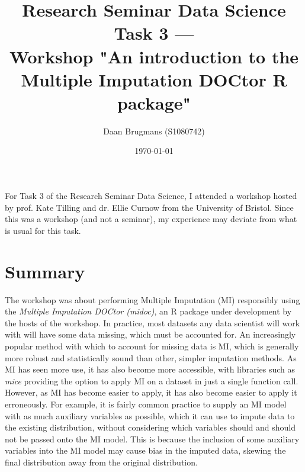 \documentclass{IEEEtran}
\begin{document}
\title{Research Seminar Data Science Task 3 --- \\Workshop "An introduction to the Multiple Imputation DOCtor R package"}
\author{Daan Brugmans (S1080742)}
\date{\today}

\maketitle

For Task 3 of the Research Seminar Data Science, I attended a workshop hosted by prof. Kate Tilling and dr. Ellie Curnow from the University of Bristol.
Since this was a workshop (and not a seminar), my experience may deviate from what is usual for this task.

\section{Summary}
The workshop was about performing Multiple Imputation (MI) responsibly using the \textit{Multiple Imputation DOCtor (midoc)}, an R package under development by the hosts of the workshop.
In practice, most datasets any data scientist will work with will have some data missing, which must be accounted for.
An increasingly popular method with which to account for missing data is MI, which is generally more robust and statistically sound than other, simpler imputation methods.
As MI has seen more use, it has also become more accessible, with libraries such as \textit{mice} providing the option to apply MI on a dataset in just a single function call.
However, as MI has become easier to apply, it has also become easier to apply it erroneously.
For example, it is fairly common practice to supply an MI model with as much auxiliary variables as possible, which it can use to impute data to the existing distribution, without considering which variables should and should not be passed onto the MI model.
This is because the inclusion of some auxiliary variables into the MI model may cause bias in the imputed data, skewing the final distribution away from the original distribution.
\end{document}
